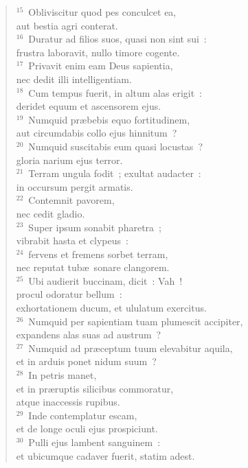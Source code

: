 \begin{flushleft}
\begin{verse}
${}^{15}$~Obliviscitur quod pes conculcet ea,\\ aut bestia agri conterat.\\
${}^{16}$~Duratur ad filios suos, quasi non sint sui~:\\ frustra laboravit, nullo timore cogente.\\
${}^{17}$~Privavit enim eam Deus sapientia,\\ nec dedit illi intelligentiam.\\
${}^{18}$~Cum tempus fuerit, in altum alas erigit~:\\ deridet equum et ascensorem ejus.\\
${}^{19}$~Numquid pr\ae bebis equo fortitudinem,\\ aut circumdabis collo ejus hinnitum~?\\
${}^{20}$~Numquid suscitabis eum quasi locustas~?\\ gloria narium ejus terror.\\
${}^{21}$~Terram ungula fodit~; exultat audacter~:\\ in occursum pergit armatis.\\
${}^{22}$~Contemnit pavorem,\\ nec cedit gladio.\\
${}^{23}$~Super ipsum sonabit pharetra~;\\ vibrabit hasta et clypeus~:\\
${}^{24}$~fervens et fremens sorbet terram,\\ nec reputat tub\ae\ sonare clangorem.\\
${}^{25}$~Ubi audierit buccinam, dicit~: Vah~!\\ procul odoratur bellum~:\\ exhortationem ducum, et ululatum exercitus.\\
${}^{26}$~Numquid per sapientiam tuam plumescit accipiter,\\ expandens alas suas ad austrum~?\\
${}^{27}$~Numquid ad pr\ae ceptum tuum elevabitur aquila,\\ et in arduis ponet nidum suum~?\\
${}^{28}$~In petris manet,\\ et in pr\ae ruptis silicibus commoratur,\\ atque inaccessis rupibus.\\
${}^{29}$~Inde contemplatur escam,\\ et de longe oculi ejus prospiciunt.\\
${}^{30}$~Pulli ejus lambent sanguinem~:\\ et ubicumque cadaver fuerit, statim adest.\end{verse}\end{flushleft}


